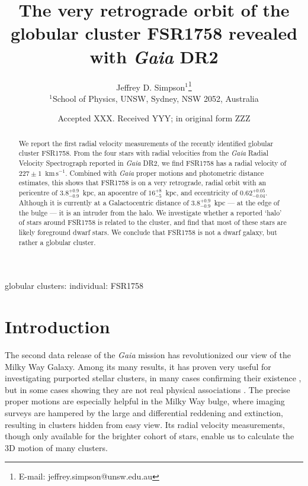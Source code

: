 \documentclass[fleqn,usenatbib]{mnras}
\title[The orbit of FSR1758]{The very retrograde orbit of the globular cluster FSR1758 revealed with \textit{Gaia} DR2}
\author[Simpson]{
Jeffrey D. Simpson$^{1}$\thanks{E-mail: jeffrey.simpson@unsw.edu.au}
\\
$^{1}$School of Physics, UNSW, Sydney, NSW 2052, Australia
}
\date{Accepted XXX. Received YYY; in original form ZZZ}
\newcommand{\kms}{~\ensuremath{\textrm{km}\,\textrm{s}^{-1}}}
\begin{document}
\label{firstpage}
\pagerange{\pageref{firstpage}--\pageref{lastpage}}
\maketitle

\begin{abstract}
We report the first radial velocity measurements of the recently identified globular cluster FSR1758. From the four stars with radial velocities from the \textit{Gaia} Radial Velocity Spectrograph reported in \textit{Gaia} DR2, we find FSR1758 has a radial velocity of $227\pm1$\kms. Combined with \textit{Gaia} proper motions and photometric distance estimates, this shows that FSR1758 is on a very retrograde, radial orbit with an pericentre of $3.8_{-0.9}^{+0.9}$~kpc, an apocentre of $16_{-5}^{+8}$~kpc, and eccentricity of $0.62_{-0.04}^{+0.05}$. Although it is currently at a Galactocentric distance of $3.8_{-0.9}^{+0.9}$~kpc --- at the edge of the bulge --- it is an intruder from the halo. We investigate whether a reported `halo' of stars around FSR1758 is related to the cluster, and find that most of these stars are likely foreground dwarf stars. We conclude that FSR1758 is not a dwarf galaxy, but rather a globular cluster.
\end{abstract}

\begin{keywords}
globular clusters: individual: FSR1758
\end{keywords}



\section{Introduction} \label{sec:intro}
The second data release of the \textit{Gaia} mission \citep{GaiaCollaboration:2018io} has revolutionized our view of the Milky Way Galaxy. Among its many results, it has proven very useful for investigating purported stellar clusters, in many cases confirming their existence \citep[e.g.,][]{Simpson:2017ex,Soubiran2018,Cantat-Gaudin2018}, but in some cases showing they are not real physical associations \citep[e.g.,][]{Kos:2018we}. The precise proper motions are especially helpful in the Milky Way bulge, where imaging surveys are hampered by the large and differential reddening and extinction, resulting in clusters hidden from easy view. Its radial velocity measurements, though only available for the brighter cohort of stars, enable us to calculate the 3D motion of many clusters.
\end{document}
